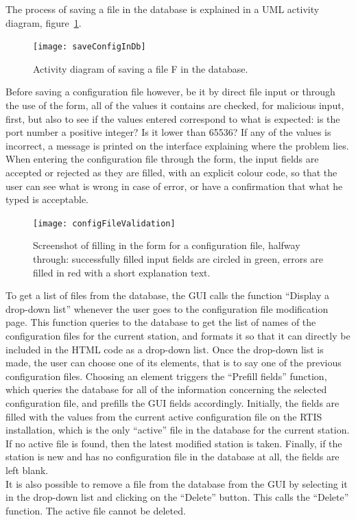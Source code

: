\documentclass{themeensg}
\begin{document}
The process of saving a file in the database is explained in a UML activity diagram, figure~\ref{fig:saveConfig}.\\

\begin{figure}[ht]
	\centering
	\texttt{[image: saveConfigInDb]}
	\caption{Activity diagram of saving a file F in the database.}
	\label{fig:saveConfig}
\end{figure}

Before saving a configuration file however, be it by direct file input or through the use of the form, all of the values it contains are checked, for malicious input, first, but also to see if the values entered correspond to what is expected: is the port number a positive integer? Is it lower than 65536? If any of the values is incorrect, a message is printed on the interface explaining where the problem lies.\\

When entering the configuration file through the form, the input fields are accepted or rejected as they are filled, with an explicit colour code, so that the user can see what is wrong in case of error, or have a confirmation that what he typed is acceptable. 

\begin{figure}[h]
	\centering
	\texttt{[image: configFileValidation]}
	\caption{Screenshot of filling in the form for a configuration file, halfway through: successfully filled input fields are circled in green, errors are filled in red with a short explanation text.}
\end{figure}

To get a list of files from the database, the GUI calls the function “Display a drop-down list” whenever the user goes to the configuration file modification page. This function queries to the database to get the list of names of the configuration files for the current station, and formats it so that it can directly be included in the HTML code as a drop-down list. Once the drop-down list is made, the user can choose one of its elements, that is to say one of the previous configuration files. Choosing an element triggers the “Prefill fields” function, which queries the database for all of the information concerning the selected configuration file, and prefills the GUI fields accordingly. Initially, the fields are filled with the values from the current active configuration file on the RTIS installation, which is the only “active” file in the database for the current station. If no active file is found, then the latest modified station is taken. Finally, if the station is new and has no configuration file in the database at all, the fields are left blank.\\
It is also possible to remove a file from the database from the GUI by selecting it in the drop-down list and clicking on the “Delete” button. This calls the “Delete” function. The active file cannot be deleted.
\end{document}
